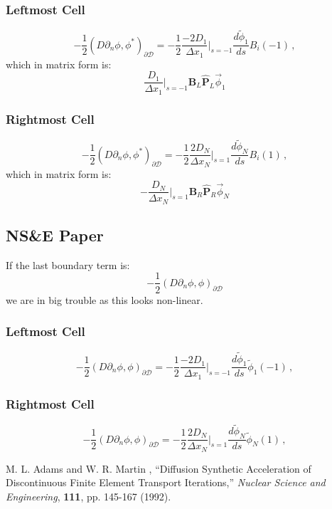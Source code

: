 \documentclass[11pt]{article}
\newcommand{\benum}{\begin{equation}}
\newcommand{\eenum}{\end{equation}}
\newcommand{\pec}{\, ,}
\begin{document}
\subsubsection{Leftmost Cell}
\benum
-\frac{1}{2}\left(D \partial_n \phi,\phi^*  \right)_{\partial \mathcal D} = -\frac{1}{2} \frac{-2D_1}{\Delta x_1}\bigg\lvert_{s=-1}  \frac{d \widetilde{\phi}_1}{d s} B_i(-1) \pec
\eenum
which in matrix form is:
\benum
\frac{D_1}{\Delta x_1}\bigg \lvert_{s=-1} \mathbf{B}_L \widehat{\mathbf P}_L \vec{\phi}_1
\eenum

\subsubsection{Rightmost Cell}
\benum
-\frac{1}{2}\left(D \partial_n \phi,\phi^*  \right)_{\partial \mathcal D} = -\frac{1}{2} \frac{2D_N}{\Delta x_N}\bigg\lvert_{s=1}  \frac{d \widetilde{\phi}_N}{d s} B_i(1) \pec
\eenum
which in matrix form is:
\benum
-\frac{D_N}{\Delta x_N}\bigg \lvert_{s=1} \mathbf{B}_R \widehat{\mathbf P}_R \vec{\phi}_N
\eenum

\subsection{NS\&E Paper}
If the last boundary term is:
\benum
-\frac{1}{2}\left(D\partial_n\phi ,\phi \right)_{\partial \mathcal D}
\eenum
we are in big trouble as this looks non-linear.

\subsubsection{Leftmost Cell}
\benum
-\frac{1}{2}\left(D \partial_n \phi,\phi  \right)_{\partial \mathcal D} = -\frac{1}{2} \frac{-2D_1}{\Delta x_1}\bigg\lvert_{s=-1}  \frac{d \widetilde{\phi}_1}{d s} \widetilde{\phi}_1(-1) \pec
\eenum

\subsubsection{Rightmost Cell}
\benum
-\frac{1}{2}\left(D \partial_n \phi,\phi  \right)_{\partial \mathcal D} = -\frac{1}{2} \frac{2D_N}{\Delta x_N}\bigg\lvert_{s=1}  \frac{d \widetilde{\phi}_N}{d s} \widetilde{\phi}_N(1) \pec
\eenum

\begin{thebibliography}{20}

 M. L. Adams and W. R. Martin , ``Diffusion Synthetic Acceleration of Discontinuous Finite Element Transport Iterations,'' {\it Nuclear Science and Engineering}, {\bf 111}, pp. 145-167 (1992).

\end{thebibliography}
\end{document}

